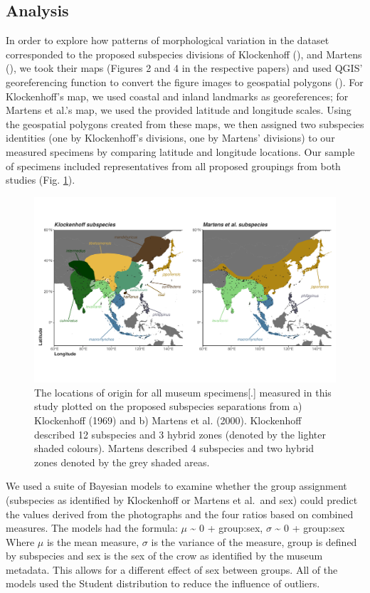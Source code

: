 \documentclass[10pt,a4paper]{article}
\begin{document}
\subsection{Analysis}\label{analysis}

In order to explore how patterns of morphological variation in the dataset corresponded to the proposed subspecies divisions of Klockenhoff (), and Martens (), we took their maps (Figures 2 and 4 in the respective papers) and used QGIS' georeferencing function to convert the figure images to geospatial polygons ().
For Klockenhoff's map, we used coastal and inland landmarks as georeferences; for Martens et al.'s map, we used the provided latitude and longitude scales.
Using the geospatial polygons created from these maps, we then assigned two subspecies identities (one by Klockenhoff's divisions, one by Martens' divisions) to our measured specimens by comparing latitude and longitude locations.
Our sample of specimens included representatives from all proposed groupings from both studies (Fig. \ref{fig:subspeciesPlots}).

\begin{figure}
\includegraphics[width=0.9\linewidth]{../Figures/combined Subspecies Plot} \caption{The locations of origin for all museum specimens[.] measured in this study plotted on the proposed subspecies separations from a) Klockenhoff (1969) and b) Martens et al. (2000). Klockenhoff described 12 subspecies and 3 hybrid zones (denoted by the lighter shaded colours). Martens described 4 subspecies and two hybrid zones denoted by the grey shaded areas.}\label{fig:subspeciesPlots}
\end{figure}

We used a suite of Bayesian models to examine whether the group assignment (subspecies as identified by Klockenhoff or Martens et al.~and sex) could predict the values derived from the photographs and the four ratios based on combined measures.
The models had the formula: \(\mu\) \textasciitilde{} 0 + group:sex, \(\sigma\) \textasciitilde{} 0 + group:sex
Where \(\mu\) is the mean measure, \(\sigma\) is the variance of the measure, group is defined by subspecies and sex is the sex of the crow as identified by the museum metadata.
This allows for a different effect of sex between groups.
All of the models used the Student distribution to reduce the influence of outliers.
\end{document}
